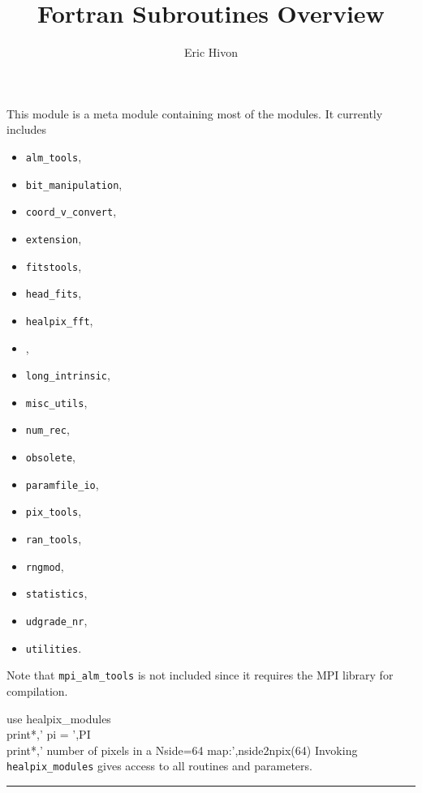 
\sloppy


\title{\healpix Fortran Subroutines Overview}
 \section[healpix\_modules module]{ }
\label{sub:healpix_modules}
\author{Eric Hivon}

\begin{facility}
{This module is a meta module containing most of the \healpix modules. It currently includes
\begin{itemize}
\setlength{\itemsep}{-5pt}
  \item {\tt{alm\_tools}},
  \item {\tt{bit\_manipulation}},
  \item {\tt{coord\_v\_convert}},
  \item {\tt{extension}},
  \item {\tt{fitstools}},
  \item {\tt{head\_fits}},
  \item {\tt{healpix\_fft}},
  \item {},
  \item {\tt{long\_intrinsic}},
  \item {\tt{misc\_utils}},
  \item {\tt{num\_rec}},
  \item {\tt{obsolete}},
  \item {\tt{paramfile\_io}},
  \item {\tt{pix\_tools}},
  \item {\tt{ran\_tools}},
  \item {\tt{rngmod}},
  \item {\tt{statistics}},
  \item {\tt{udgrade\_nr}},
  \item {\tt{utilities}}.
\end{itemize}

Note that {\tt{mpi\_alm\_tools}} is not included since it requires the MPI library for compilation.
}
{\modHealpixModules}
\end{facility}


\begin{example}
{
use healpix\_modules \\
print*,' pi = ',PI \\
print*,' number of pixels in a Nside=64 map:',nside2npix(64)
}
{
Invoking {\tt{healpix\_modules}} gives access to all \healpix routines and parameters.
}
\end{example}


\rule{\hsize}{2mm}

\newpage
